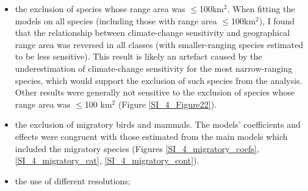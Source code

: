 \begin{itemize}
\item 
the exclusion of species whose range area was $\leq$100km$^2$. When fitting the models on all species (including those with range area $\leq$100km$^2$), I found that the relationship between climate-change sensitivity and geographical range area was reversed in all classes (with smaller-ranging species estimated to be less sensitive). This result is likely an artefact caused by the underestimation of climate-change sensitivity for the most narrow-ranging species, which would support the exclusion of such species from the analysis. Other results were generally not sensitive to the exclusion of species whose range area was $\leq$100 km$^2$ (Figure \ref{SI_4_Figure22}).

\item 
the exclusion of migratory birds and mammals. The models' coefficients and effects were congruent with those estimated from the main models which included the migratory species (Figures \ref{SI_4_migratory_coefs}, \ref{SI_4_migratory_cat}, \ref{SI_4_migratory_cont}).

\item 
the use of different resolutions;
\end{itemize} 




\clearpage

